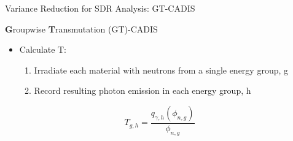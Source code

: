 \documentclass{beamer}
\begin{document}
\begin{frame}{Variance Reduction for SDR Analysis: GT-CADIS}
\begin{block}{\textbf{G}roupwise \textbf{T}ransmutation (GT)-CADIS \cite{gtcadis}}
  \begin{itemize}
	  \item{Calculate T:}
	  \begin{enumerate}
		  \item{Irradiate each material with neutrons from a single
			  energy group, g}
		  \item{Record resulting photon emission in each energy group,
			  h}
	  \end{enumerate}
  \end{itemize}
	\begin{equation}
		T_{g,h} = \frac{q_{\gamma,h}(\phi_{n,g})}{\phi_{n,g}}
	\end{equation}
\end{block}
\end{frame}


%

\end{document}
